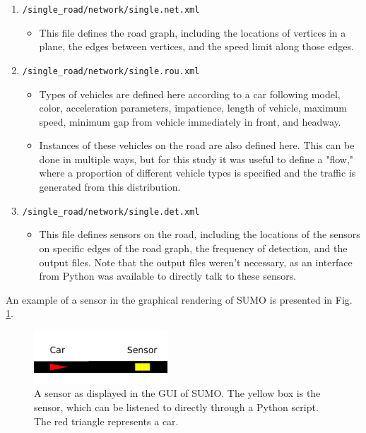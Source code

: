 \documentclass[11pt,nofootinbib]{revtex4}
\begin{document}
\begin{enumerate}
    \item \verb|/single_road/network/single.net.xml|
    \begin{itemize}
        \item This file defines the road graph, including the locations of vertices in a plane, the edges between vertices, and the speed limit along those edges. 
    \end{itemize}
    \item \verb|/single_road/network/single.rou.xml|
    \begin{itemize}
        \item Types of vehicles are defined here according to a car following model, color, acceleration parameters, impatience, length of vehicle, maximum speed, minimum gap from vehicle immediately in front, and headway. 
        \item Instances of these vehicles on the road are also defined here. This can be done in multiple ways, but for this study it was useful to define a "flow," where a proportion of different vehicle types is specified and the traffic is generated from this distribution. 
    \end{itemize}
    \item \verb|/single_road/network/single.det.xml|
    \begin{itemize}
        \item This file defines sensors on the road, including the locations of the sensors on specific edges of the road graph, the frequency of detection, and the output files. Note that the output files weren't necessary, as an interface from Python was available to directly talk to these sensors. 
    \end{itemize}
\end{enumerate}

An example of a sensor in the graphical rendering of SUMO is presented in Fig. \ref{sensor}. 
\begin{figure}[H]
\centering
\includegraphics[width = 50mm]{images/sensors.png}
\caption{A sensor as displayed in the GUI of SUMO. The yellow box is the sensor, which can be listened to directly through a Python script. The red triangle represents a car.}
\label{sensor}
\end{figure}
\end{document}
